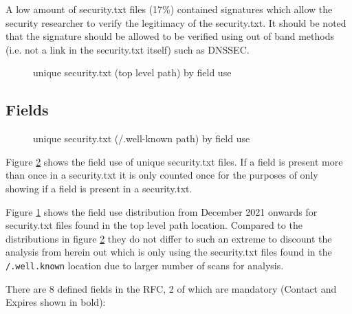 \documentclass{mscreport}
\begin{document}
\vspace{0.3cm} \noindent
A low amount of security.txt files (17\%) contained signatures which allow the security researcher to verify the legitimacy of the security.txt. It should be noted that the signature should be allowed to be verified using out of band methods (i.e. not a link in the security.txt itself) such as DNSSEC.

\begin{figure}[H]
	\begin{center}
		\caption{unique security.txt (top level path) by field use}
		\label{fig:security_txt_by_fields_root_only}
	\end{center}
\end{figure}

\clearpage
\newpage

\subsection{Fields}


\begin{figure}[t]
	\begin{center}
		\caption{unique security.txt (/.well-known path) by field use}
		\label{fig:security_txt_by_fields}
	\end{center}
\end{figure}

\noindent
Figure \ref{fig:security_txt_by_fields} shows the field use of unique security.txt files. If a field is present more than once in a security.txt it is only counted once for the purposes of only showing if a field is present in a security.txt.

\vspace{0.3cm} \noindent
Figure \ref{fig:security_txt_by_fields_root_only} shows the field use distribution from December 2021 onwards for security.txt files found in the top level path location. Compared to the distributions in figure \ref{fig:security_txt_by_fields} they do not differ to such an extreme to discount the analysis from herein out which is only using the security.txt files found in the \texttt{/.well.known} location due to larger number of scans for analysis.

\vspace{0.3cm} \noindent
There are 8 defined fields in the RFC, 2 of which are mandatory (Contact and Expires shown in bold):
\end{document}
